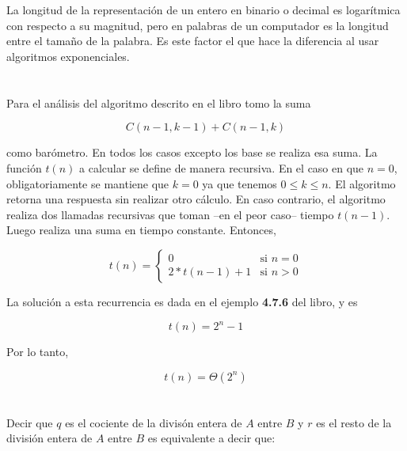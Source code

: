 \documentclass{article}
\begin{document}
\section{}

La longitud de la representación de un entero en binario o decimal es logarítmica con
respecto a su magnitud, pero en palabras de un computador es la longitud entre el tamaño
de la palabra. Es este factor el que hace la diferencia al usar algoritmos exponenciales.

\section{}

Para el análisis del algoritmo descrito en el libro tomo la suma

\begin{equation}
 C(n-1,k-1) + C(n-1,k)
\end{equation}

como barómetro. En todos los casos excepto los base se realiza esa suma.
La función $t(n)$ a calcular se define de manera recursiva.
En el caso en que $n = 0$, obligatoriamente se mantiene que $k = 0$ ya que
tenemos $0 \leq k \leq n$. El algoritmo retorna una respuesta sin realizar otro
cálculo. En caso contrario, el algoritmo realiza dos llamadas recursivas que
toman --en el peor caso-- tiempo $t(n-1)$. Luego realiza una suma
en tiempo constante. Entonces,

$$
 t(n) = \left\{ \begin{array}{ll}
 0 & \textrm{si $n = 0$} \\
 2*t(n-1)+1 & \textrm{si $n > 0$}
 \end{array} \right.
$$

La solución a esta recurrencia es dada en el ejemplo {\bf 4.7.6} del libro, y es

\begin{equation}
 t(n) = 2^n-1
\end{equation}

Por lo tanto,

\begin{equation}
t(n) = \Theta(2^n)
\end{equation}

\section{}

Decir que $q$ es el cociente de la divisón entera de $A$ entre $B$ y $r$ es el
resto de la división entera de $A$ entre $B$ es equivalente a decir que:
\end{document}
